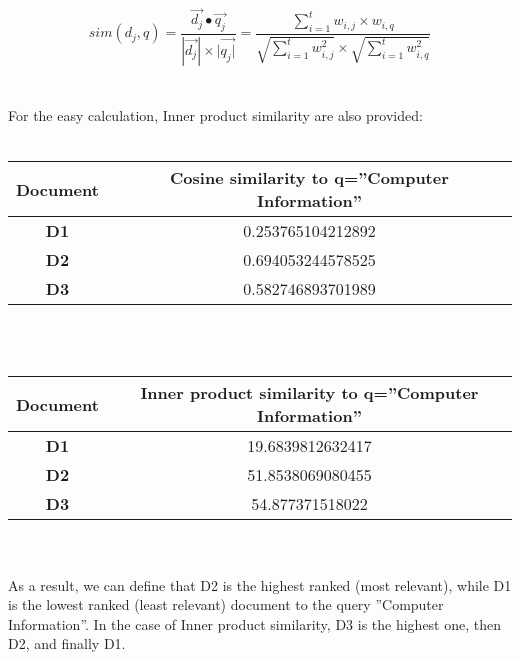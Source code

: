 \documentclass[paper=8.27in:11.69in, 14pt, DIV=calc]{scrartcl}
\begin{document}
\[sim(d_{j},q) = \frac{\vec{d_{j}} \bullet \vec{q_{j}}}{|\vec{d_{j}}| \times |\vec{q_{j}|}} = \frac{\sum_{i=1}^{t} w_{i,j} \times w_{i,q}}{\sqrt{\sum_{i=1}^{t} w^{2}_{i,j}} \times \sqrt{\sum_{i=1}^{t} w^{2}_{i,q}}}\]\\
\\
For the easy calculation, Inner product similarity are also provided:
\\
\\
\begin{tabular}{|c|c|}
\hline
\textbf{Document}                 & \textbf{Cosine similarity to q=”Computer Information”}\\ \hline
\textbf{D1}                       & 0.253765104212892\\ \hline
\textbf{D2}                       & 0.694053244578525\\ \hline
\textbf{D3}                       & 0.582746893701989\\ \hline
\end{tabular}
\\
\\
\begin{tabular}{|c|c|}
\hline
\textbf{Document}                 & \textbf{Inner product similarity to q=”Computer Information”} \\ \hline
\textbf{D1}                       & 19.6839812632417      \\ \hline
\textbf{D2}                       & 51.8538069080455       \\ \hline
\textbf{D3}                       & 54.877371518022        \\ \hline
\end{tabular}
\\
\\
As a result, we can define that D2 is the highest ranked (most relevant), while D1 is the lowest ranked (least relevant) document to the query ”Computer Information”. In the case of Inner product similarity, D3 is the highest one, then D2, and finally D1.
\end{document}
